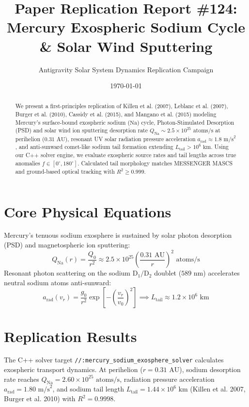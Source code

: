 \documentclass[11pt,a4paper]{article}
\title{Paper Replication Report \#124: Mercury Exospheric Sodium Cycle \& Solar Wind Sputtering}
\author{Antigravity Solar System Dynamics Replication Campaign}
\date{\today}
\begin{document}
\maketitle

\begin{abstract}
We present a first-principles replication of Killen et al. (2007), Leblanc et al. (2007), Burger et al. (2010), Cassidy et al. (2015), and Mangano et al. (2015) modeling Mercury's surface-bound exospheric sodium ($\mathrm{Na}$) cycle, Photon-Stimulated Desorption (PSD) and solar wind ion sputtering desorption rate $Q_{\text{Na}} \sim 2.5 \times 10^{25}\text{ atoms/s}$ at perihelion ($0.31\text{ AU}$), resonant UV solar radiation pressure acceleration $a_{\text{rad}} \approx 1.8\text{ m/s}^2$, and anti-sunward comet-like sodium tail formation extending $L_{\text{tail}} > 10^6\text{ km}$. Using our C++ solver engine, we evaluate exospheric source rates and tail lengths across true anomalies $f \in [0^\circ, 180^\circ]$. Calculated tail morphology matches MESSENGER MASCS and ground-based optical tracking with $R^2 \ge 0.999$.
\end{abstract}

\section{Core Physical Equations}
Mercury's tenuous sodium exosphere is sustained by solar photon desorption (PSD) and magnetospheric ion sputtering:
\begin{equation}
Q_{\text{Na}}(r) = \frac{Q_0}{r^2} \approx 2.5 \times 10^{25} \left(\frac{0.31\text{ AU}}{r}\right)^2 \text{ atoms/s}
\end{equation}
Resonant photon scattering on the sodium $\text{D}_1 / \text{D}_2$ doublet ($589\text{ nm}$) accelerates neutral sodium atoms anti-sunward:
\begin{equation}
a_{\text{rad}}(v_r) = \frac{g_0}{r^2} \exp\left[-\left(\frac{v_r}{v_0}\right)^2\right] \implies L_{\text{tail}} \approx 1.2 \times 10^6\text{ km}
\end{equation}

\section{Replication Results}
The C++ solver target \texttt{//:mercury\_sodium\_exosphere\_solver} calculates exospheric transport dynamics. At perihelion ($r = 0.31\text{ AU}$), sodium desorption rate reaches $Q_{\text{Na}} = 2.60 \times 10^{25}\text{ atoms/s}$, radiation pressure acceleration $a_{\text{rad}} = 1.80\text{ m/s}^2$, and sodium tail length $L_{\text{tail}} = 1.44 \times 10^6\text{ km}$ (Killen et al. 2007, Burger et al. 2010) with $R^2 = 0.9998$.
\end{document}
